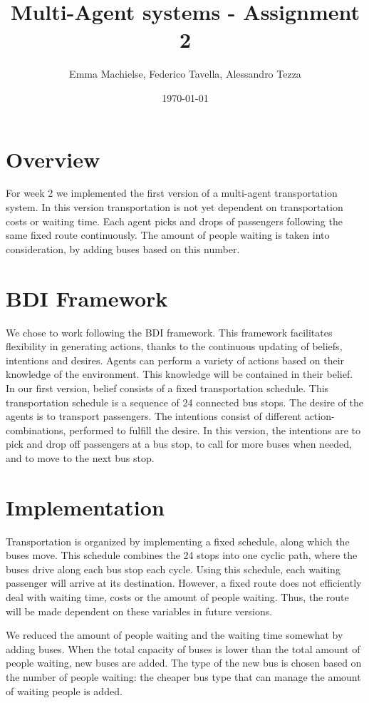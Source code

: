 \documentclass[a4paper]{article}
\title{Multi-Agent systems - Assignment 2}
\author{Emma Machielse, Federico Tavella, Alessandro Tezza}
\date{\today}
\begin{document}
\maketitle

\section{Overview}
For week 2 we implemented the first version of a multi-agent transportation system. In this version transportation is not yet dependent on transportation costs or waiting time. Each agent picks and drops of passengers following the same fixed route continuously. The amount of people waiting is taken into consideration, by adding buses based on this number.

\section{BDI Framework}

We chose to work following the BDI framework. This framework facilitates flexibility in generating actions, thanks to the continuous updating of beliefs, intentions and desires. Agents can perform a variety of actions based on their knowledge of the environment. This knowledge will be contained in their belief. In our first version, belief consists of a fixed transportation schedule. This transportation schedule is a sequence of 24 connected bus stops. The desire of the agents is to transport passengers. The intentions consist of different action-combinations, performed to fulfill the desire. In this version, the intentions are to pick and drop off passengers at a bus stop, to call for more buses when needed, and to move to the next bus stop.

\section{Implementation}

Transportation is organized by implementing a fixed schedule, along which the buses move. This schedule combines the 24 stops into one cyclic path, where the buses drive along each bus stop each cycle. Using this schedule, each waiting passenger will arrive at its destination. However, a fixed route does not efficiently deal with waiting time, costs or the amount of people waiting. Thus, the route will be made dependent on these variables in future versions.

We reduced the amount of people waiting and the waiting time somewhat by adding buses. When the total capacity of buses is lower than the total amount of people waiting, new buses are added. The type of the new bus is chosen based on the number of people waiting: the cheaper bus type that can manage the amount of waiting people is added.
\end{document}
